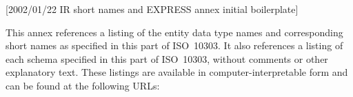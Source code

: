 [2002/01/22 IR short names and EXPRESS annex initial boilerplate]

  This annex references a listing of the \Express{} entity data type
names and corresponding short names as specified in this part of ISO~10303.
It also references a listing of each \Express{} schema specified in
this part of ISO~10303, without comments or other explanatory text. These
listings are available in computer-interpretable form
and can be found at the following URLs:

\endinput
